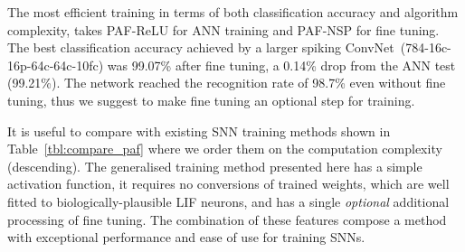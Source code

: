 	
	
	
	The most efficient training in terms of both classification accuracy and algorithm complexity, takes PAF-ReLU for ANN training and PAF-NSP for fine tuning.
	The best classification accuracy achieved by a larger spiking ConvNet~(784-16c-16p-64c-64c-10fc) was 99.07\% after fine tuning, a 0.14\% drop from the ANN test (99.21\%).
	The network reached the recognition rate of 98.7\% even without fine tuning, thus we suggest to make fine tuning an optional step for training.
	
	
	It is useful to compare with existing SNN training methods shown in Table~\ref{tbl:compare_paf} where we order them on the computation complexity (descending).
	The generalised training method presented here has a simple activation function, it requires no conversions of trained weights, which are well fitted to biologically-plausible LIF neurons, and has a single \emph{optional} additional processing of fine tuning.
	The combination of these features compose a method with exceptional performance and ease of use for training SNNs.
	
